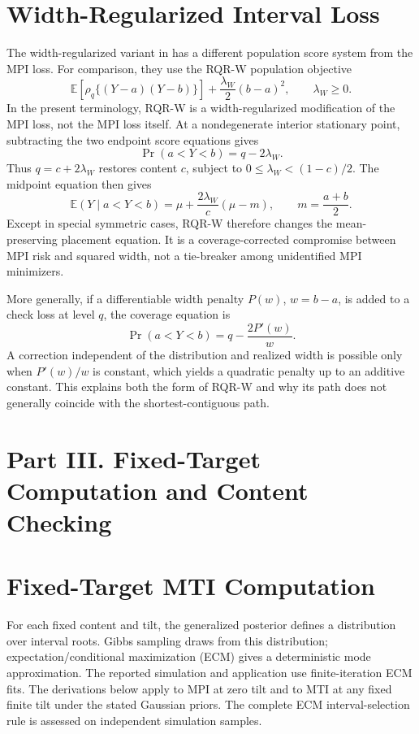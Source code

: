 \documentclass[11pt]{article}
\newcommand{\E}{\mathbb{E}}
\begin{document}
\section{Width-Regularized Interval Loss}
\label{sec:supp-rqr-w}

The width-regularized variant in \citet{PouplinEtAl2024RQR} has a different
population score system from the MPI loss. For comparison, they use the RQR-W
population objective
\[
\E\left[\rho_q\{(Y-a)(Y-b)\}\right]
+\frac{\lambda_W}{2}(b-a)^2,
\qquad \lambda_W\ge0.
\]
In the present terminology, RQR-W is a width-regularized modification of the
MPI loss, not the MPI loss itself.
At a nondegenerate interior stationary point, subtracting the two endpoint
score equations gives
\[
\Pr(a<Y<b)=q-2\lambda_W.
\]
Thus \(q=c+2\lambda_W\) restores content \(c\), subject to
\(0\le\lambda_W<(1-c)/2\). The midpoint equation then gives
\[
\E(Y\mid a<Y<b)
=\mu+\frac{2\lambda_W}{c}(\mu-m),
\qquad m=\frac{a+b}{2}.
\]
Except in special symmetric cases, RQR-W therefore changes the
mean-preserving placement equation. It is a coverage-corrected compromise
between MPI risk and squared width, not a tie-breaker among
unidentified MPI minimizers.

More generally, if a differentiable width penalty \(P(w)\), \(w=b-a\), is
added to a check loss at level \(q\), the coverage equation is
\[
\Pr(a<Y<b)=q-\frac{2P'(w)}{w}.
\]
A correction independent of the distribution and realized width is possible
only when \(P'(w)/w\) is constant, which yields a quadratic penalty up to an
additive constant. This explains both the form of RQR-W and why its path does
not generally coincide with the shortest-contiguous path.


\section*{Part III. Fixed-Target Computation and Content Checking}

\section{Fixed-Target MTI Computation}
\label{sec:supp-mti-ecm}

For each fixed content and tilt, the generalized posterior defines a
distribution over interval roots. Gibbs sampling draws from this distribution;
expectation/conditional maximization (ECM) gives a deterministic mode
approximation. The reported simulation and application use finite-iteration
ECM fits. The derivations below apply to MPI at zero tilt and to MTI at any
fixed finite tilt under the stated Gaussian priors. The complete ECM
interval-selection rule is assessed on independent simulation samples.
\end{document}
